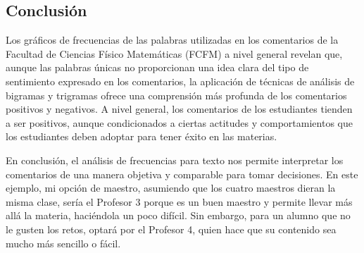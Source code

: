 \documentclass[a4paper,12pt]{article}
\begin{document}
\subsection{Conclusión}
Los gráficos de frecuencias de las palabras utilizadas en los comentarios de la Facultad de Ciencias Físico Matemáticas (FCFM) a nivel general revelan que, aunque las palabras únicas no proporcionan una idea clara del tipo de sentimiento expresado en los comentarios, la aplicación de técnicas de análisis de bigramas y trigramas ofrece una comprensión más profunda de los comentarios positivos y negativos. A nivel general, los comentarios de los estudiantes tienden a ser positivos, aunque condicionados a ciertas actitudes y comportamientos que los estudiantes deben adoptar para tener éxito en las materias.

En conclusión, el análisis de frecuencias para texto nos permite interpretar los comentarios de una manera objetiva y comparable para tomar decisiones. En este ejemplo, mi opción de maestro, asumiendo que los cuatro maestros dieran la misma clase, sería el Profesor 3 porque es un buen maestro y permite llevar más allá la materia, haciéndola un poco difícil. Sin embargo, para un alumno que no le gusten los retos, optará por el Profesor 4, quien hace que su contenido sea mucho más sencillo o fácil.




\end{document}

